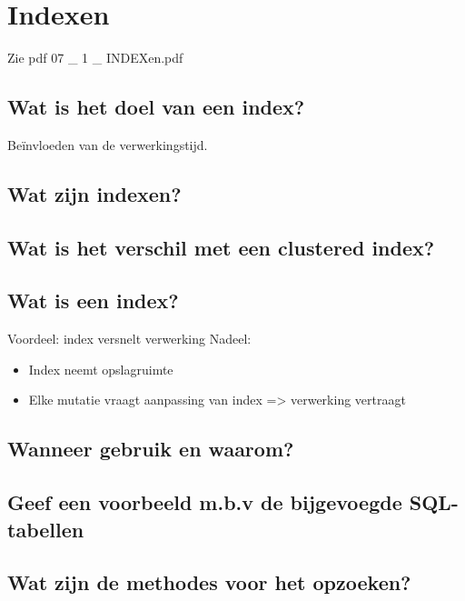 \newpage

\section{Indexen}

Zie pdf 07 \_ 1 \_ INDEXen.pdf

\subsection{Wat is het doel van een index?}
Beïnvloeden van de verwerkingstijd.
\subsection{Wat zijn indexen? }

\subsection{Wat is het verschil met een clustered index?}

\subsection{Wat is een index? }
Voordeel: index versnelt verwerking
Nadeel:
\begin{itemize}
    \item Index neemt opslagruimte
    \item Elke mutatie vraagt aanpassing van index => verwerking vertraagt
\end{itemize}
	
\subsection{Wanneer gebruik en waarom? }

\subsection{Geef een voorbeeld m.b.v de bijgevoegde SQL-tabellen}

\subsection{Wat zijn de methodes voor het opzoeken?}

